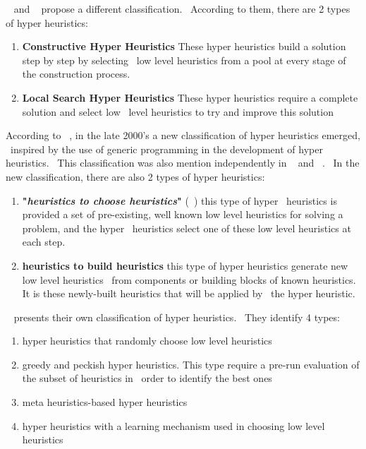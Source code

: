 ~\cite{rbai} and ~\cite{pross} propose a different classification. \
According to them, there are 2 types of hyper heuristics:
\begin{enumerate}
    \item \textbf{Constructive Hyper Heuristics} These hyper heuristics build a solution step by step by selecting \
low level heuristics from a pool at every stage of the construction process.
    \item \textbf{Local Search Hyper Heuristics} These hyper heuristics require a complete solution and select low \
level heuristics to try and improve this solution
\end{enumerate}

According to ~\cite{MetaHeuristicsHandbook}, in the late 2000's a new classification of hyper heuristics emerged, \
inspired by the use of generic programming in the development of hyper heuristics. \
This classification was also mention independently in ~\cite{metabib01} and ~\cite{metabib10}. \
In the new classification, there are also 2 types of hyper heuristics:
\begin{enumerate}
    \item \textbf{"\textit{heuristics to choose heuristics}"} (~\cite{MetaHeuristicsHandbook}) this type of hyper \
heuristics is provided a set of pre-existing, well known low level heuristics for solving a problem, and the hyper \
heuristics select one of these low level heuristics at each step.
    \item \textbf{heuristics to build heuristics} this type of hyper heuristics generate new low level heuristics \
from components or building blocks of known heuristics. It is these newly-built heuristics that will be applied by \
the hyper heuristic.
\end{enumerate}

~\cite{metabib16} presents their own classification of hyper heuristics. \
They identify 4 types:
\begin{enumerate}
    \item hyper heuristics that randomly choose low level heuristics
    \item greedy and peckish hyper heuristics. This type require a pre-run evaluation of the subset of heuristics in \
order to identify the best ones
    \item meta heuristics-based hyper heuristics
    \item hyper heuristics with a learning mechanism used in choosing low level heuristics
\end{enumerate}

